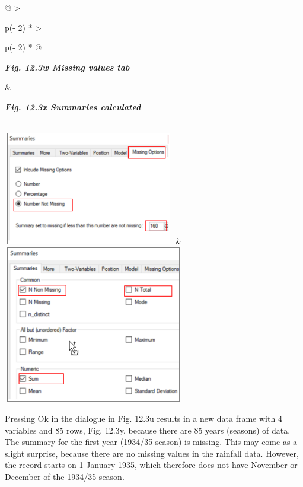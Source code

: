 \documentclass[
  letterpaper,
  DIV=11,
  numbers=noendperiod]{scrreprt}
\begin{document}
\begin{longtable}[]{@{}
  >{\raggedright\arraybackslash}p{(\columnwidth - 2\tabcolsep) * }
  >{\raggedright\arraybackslash}p{(\columnwidth - 2\tabcolsep) * }@{}}
\toprule\noalign{}
\begin{minipage}[b]{\linewidth}\raggedright
\textbf{\emph{Fig. 12.3w Missing values tab}}
\end{minipage} & \begin{minipage}[b]{\linewidth}\raggedright
\textbf{\emph{Fig. 12.3x Summaries calculated}}
\end{minipage} \\
\midrule\noalign{}
\endhead
\bottomrule\noalign{}
\endlastfoot
\includegraphics[width=2.94948in,height=1.95758in]{figures/Fig12.3w.png}
&
\includegraphics[width=3.11883in,height=2.71695in]{figures/Fig12.3x.png} \\
\end{longtable}

Pressing Ok in the dialogue in Fig. 12.3u results in a new data frame
with 4 variables and 85 rows, Fig. 12.3y, because there are 85 years
(seasons) of data. The summary for the first year (1934/35 season) is
missing. This may come as a slight surprise, because there are no
missing values in the rainfall data. However, the record starts on 1
January 1935, which therefore does not have November or December of the
1934/35 season.
\end{document}
